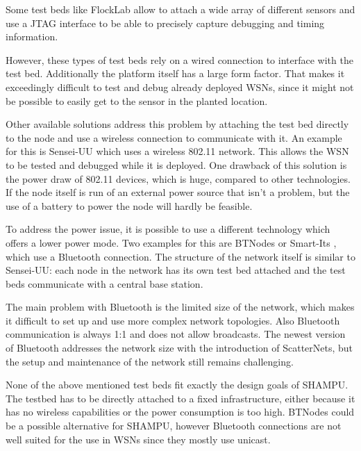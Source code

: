 Some test beds like FlockLab \cite{Lim2013} allow to attach a wide array of different sensors and use a JTAG interface to be able to precisely capture debugging and timing information.

However, these types of test beds rely on a wired connection to interface with the test bed. Additionally the platform itself has a large form factor. That makes it exceedingly difficult to test and debug already deployed WSNs, since it might not be possible to easily get to the sensor in the planted location.

Other available solutions address this problem by attaching the test bed directly to the node and use a wireless connection to communicate with it. An example for this is Sensei-UU \cite{Rensfelt2009} which uses a wireless 802.11 network. This allows the WSN to be tested and debugged while it is deployed. One drawback of this solution is the power draw of 802.11 devices, which is huge, compared to other technologies. If the node itself is run of an external power source that isn't a problem, but the use of a battery to power the node will hardly be feasible.

To address the power issue, it is possible to use a different technology which offers a lower power mode. Two examples for this are BTNodes \cite{Moser} or Smart-Its \cite{Kasten2000}, which use a Bluetooth connection. 
The structure of the network itself is similar to Sensei-UU: each node in the network has its own test bed attached and the test beds communicate with a central base station.

The main problem with Bluetooth is the limited size of the network, which makes it difficult to set up and use more complex network topologies. Also Bluetooth communication is always 1:1 and does not allow broadcasts. The newest version of Bluetooth addresses the network size with the introduction of ScatterNets, but the setup and maintenance of the network still remains challenging.

None of the above mentioned test beds fit exactly the design goals of SHAMPU. The testbed has to be directly attached to a fixed infrastructure, either because it has no wireless capabilities or the power consumption is too high. BTNodes could be a possible alternative for SHAMPU, however Bluetooth connections are not well suited for the use in WSNs since they mostly use unicast.
